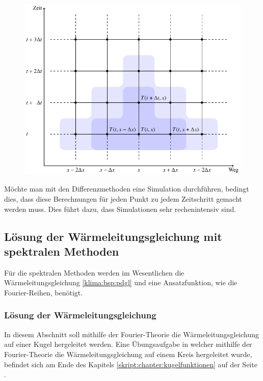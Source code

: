 \begin{refsection}
\begin{figure}
\centering
\includegraphics[width=\hsize]{klima/differenzen.pdf}
\caption{
\label{klima:wettervorhersagen:diff}}
\end{figure}

Möchte man mit den Differenzmethoden eine Simulation durchführen, bedingt dies, dass diese Berechnungen für jeden Punkt zu jedem Zeitschritt gemacht werden muss. Dies führt dazu, dass Simulationen sehr rechenintensiv sind.


\subsection{Lösung der Wärmeleitungsgleichung mit spektralen Methoden}
Für die spektralen Methoden werden im Wesentlichen die Wärmeleitungsgleichung \eqref{klima:bsp:pdgl}
und eine Ansatzfunktion, wie die Fourier-Reihen, benötigt.


\subsubsection{Lösung der Wärmeleitungsgleichung}
In diesem Abschnitt soll mithilfe der Fourier-Theorie die Wärmeleitungsgleichung auf einer Kugel hergeleitet werden. Eine Übungsaufgabe in welcher mithilfe der Fourier-Theorie die  Wärmeleitungsgleichung auf einem Kreis hergeleitet wurde, befindet sich am Ende des Kapitels \ref{skript:chapter:kugelfunktionen}  auf der Seite \pageref{skript:1101:pdgl}.


\end{refsection}
